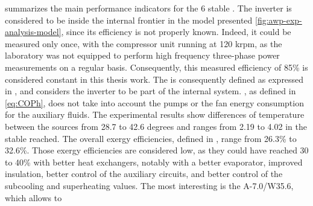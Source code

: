  summarizes the main performance
indicators for the 6 stable \OP{}. The inverter is considered to be
inside the internal frontier in the model presented
\cref{fig:awp-exp-analysis-model}, since its efficiency is not
properly known. Indeed, it could be measured only once, with the
compressor unit running at 120 krpm, as the laboratory was not
equipped to perform high frequency three-phase power measurements on a
regular basis. Consequently, this measured efficiency of 85\% is
considered constant in this thesis work. The \COP{} is consequently
defined as expressed in , and considers the inverter to
be part of the internal system. \COP{}, as defined in \cref{eq:COPh},
does not take into account the pumps or the fan energy consumption
for the auxiliary fluids. The experimental results show differences of
temperature between the sources from 28.7 to 42.6 degrees and \COP{}
ranges from 2.19 to 4.02 in the stable \OP{} reached. The overall
exergy efficiencies, defined in , range from
26.3\% to 32.6\%. Those exergy efficiencies are considered low, as
they could have reached 30 to 40\% with better heat exchangers,
notably with a better evaporator, improved
insulation, better control of the
auxiliary circuits,
and better control of the subcooling and superheating
values. The most interesting \OP{}
is the \OP{} A-7.0/W35.6, which allows to
